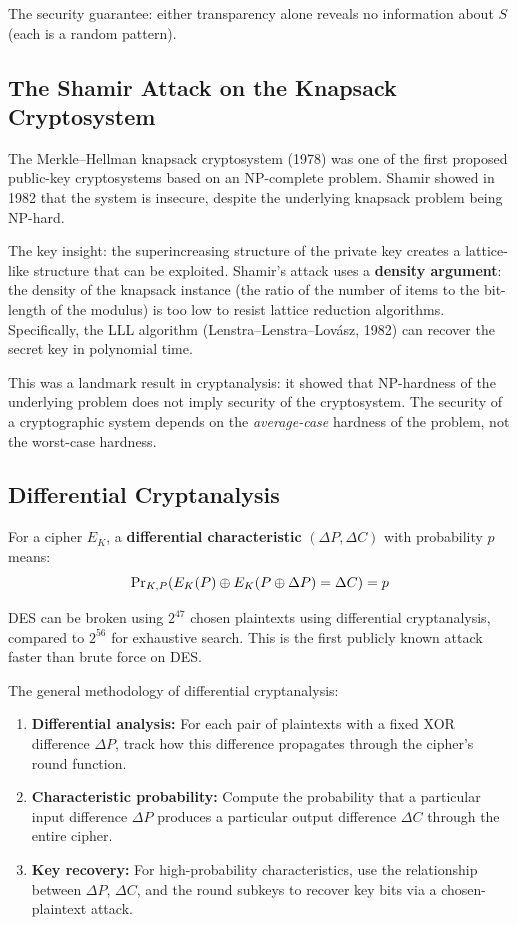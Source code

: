 The security guarantee: either transparency alone reveals no information about $S$ (each is a random pattern).

\subsection{The Shamir Attack on the Knapsack Cryptosystem}

The Merkle--Hellman knapsack cryptosystem (1978) was one of the first proposed public-key cryptosystems based on an NP-complete problem. Shamir showed in 1982 that the system is insecure, despite the underlying knapsack problem being NP-hard.

The key insight: the superincreasing structure of the private key creates a lattice-like structure that can be exploited. Shamir's attack uses a \textbf{density argument}: the density of the knapsack instance (the ratio of the number of items to the bit-length of the modulus) is too low to resist lattice reduction algorithms. Specifically, the LLL algorithm (Lenstra--Lenstra--Lov\'asz, 1982) can recover the secret key in polynomial time.

This was a landmark result in cryptanalysis: it showed that NP-hardness of the underlying problem does not imply security of the cryptosystem. The security of a cryptographic system depends on the \textit{average-case} hardness of the problem, not the worst-case hardness.

\subsection{Differential Cryptanalysis}

\begin{definition}
For a cipher $E_K$, a \textbf{differential characteristic} $(\Delta P, \Delta C)$ with probability $p$ means:
\[
\operatorname{Pr}_{K, P}(E_K(P) \oplus E_K(P \oplus \Delta P) = \Delta C) = p
\]
\end{definition}

\begin{theorem}
DES can be broken using $2^{47}$ chosen plaintexts using differential cryptanalysis, compared to $2^{56}$ for exhaustive search. This is the first publicly known attack faster than brute force on DES.
\end{theorem}

The general methodology of differential cryptanalysis:
\begin{enumerate}
    \item \textbf{Differential analysis:} For each pair of plaintexts with a fixed XOR difference $\Delta P$, track how this difference propagates through the cipher's round function.
    \item \textbf{Characteristic probability:} Compute the probability that a particular input difference $\Delta P$ produces a particular output difference $\Delta C$ through the entire cipher.
    \item \textbf{Key recovery:} For high-probability characteristics, use the relationship between $\Delta P$, $\Delta C$, and the round subkeys to recover key bits via a chosen-plaintext attack.
\end{enumerate}


